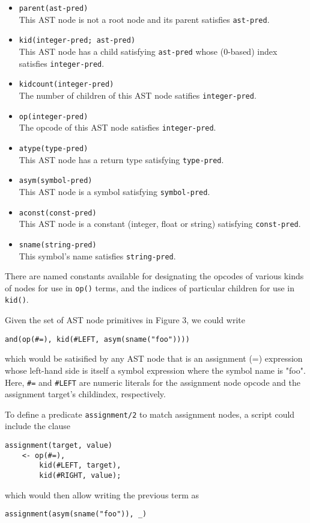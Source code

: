 \begin{itemize}
  \item 
\verb|parent(ast-pred)|\\
This AST node is not a root node and its parent satisfies \verb|ast-pred|.
  \item 
\verb|kid(integer-pred; ast-pred)|\\
This AST node has a child satisfying \verb|ast-pred| whose (0-based) index
satisfies \verb|integer-pred|.
  \item 
\verb|kidcount(integer-pred)|\\
The number of children of this AST node satifies \verb|integer-pred|. 
  \item 
\verb|op(integer-pred)|\\
The opcode of this AST node satisfies \verb|integer-pred|. 
  \item 
\verb|atype(type-pred)|\\
This AST node has a return type satisfying \verb|type-pred|. 
  \item 
\verb|asym(symbol-pred)|\\
This AST node is a symbol satisfying \verb|symbol-pred|. 
  \item 
\verb|aconst(const-pred)|\\
This AST node is a constant (integer, float or string) satisfying
\verb|const-pred|.
  \item 
\verb|sname(string-pred)|\\
This symbol's name satisfies \verb|string-pred|. 
\end{itemize}

There are named constants available for designating the opcodes of various kinds
of nodes for use in \verb|op()| terms, and the indices of particular children
for use in \verb|kid()|.


Given the set of AST node primitives in Figure 3, we could write
\begin{verbatim}
and(op(#=), kid(#LEFT, asym(sname("foo"))))
\end{verbatim}
which would be satisified by any AST node that is an assignment (=) expression
whose left-hand side is itself a symbol expression where the symbol name is
"foo". Here, \verb|#=| and \verb|#LEFT| are numeric literals for the assignment
node opcode and the assignment target's childindex, respectively.

To define a predicate \verb|assignment/2| to match assignment nodes, a script
could include the clause
\begin{verbatim}
assignment(target, value)
    <- op(#=),
        kid(#LEFT, target),
        kid(#RIGHT, value);
\end{verbatim}
which would then allow writing the previous term as
\begin{verbatim}
assignment(asym(sname("foo")), _)
\end{verbatim}


